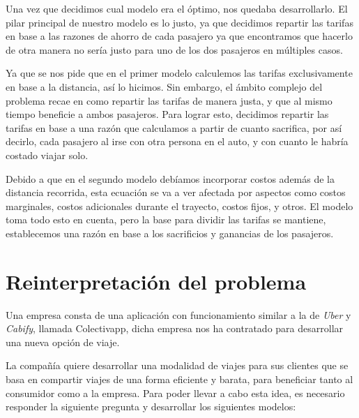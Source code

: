 \documentclass[12pt]{report}
\begin{document}
Una vez que decidimos cual modelo era el óptimo, nos quedaba desarrollarlo. El pilar principal de nuestro modelo es lo justo, ya que decidimos repartir las tarifas en base a las razones de ahorro de cada pasajero ya que encontramos que hacerlo de otra manera no sería justo para uno de los dos pasajeros en múltiples casos.

Ya que se nos pide que en el primer modelo calculemos las tarifas exclusivamente en base a la distancia, así lo hicimos. Sin embargo, el ámbito complejo del problema recae en como repartir las tarifas de manera justa, y que al mismo tiempo beneficie a ambos pasajeros. Para lograr esto, decidimos repartir las tarifas en base a una razón que calculamos a partir de cuanto sacrifica, por así decirlo, cada pasajero al irse con otra persona en el auto, y con cuanto le habría costado viajar solo.

Debido a que en el segundo modelo debíamos incorporar costos además de la distancia recorrida, esta ecuación se va a ver afectada por aspectos como costos marginales, costos adicionales durante el trayecto, costos fijos, y otros. El modelo toma todo esto en cuenta, pero la base para dividir las tarifas se mantiene, establecemos una razón en base a los sacrificios y ganancias de los pasajeros.






\newpage
\section*{Reinterpretación del problema}
Una empresa consta de una aplicación con funcionamiento similar a la de \textit{Uber} y \textit{Cabify}, llamada Colectivapp, dicha empresa nos ha contratado para desarrollar una nueva opción de viaje.

La compañía quiere desarrollar una modalidad de viajes para sus clientes que se basa en compartir viajes de una forma eficiente y barata, para beneficiar tanto al consumidor como a la empresa. Para poder llevar a cabo esta idea, es necesario responder la siguiente pregunta y desarrollar los siguientes modelos: 
\end{document}
